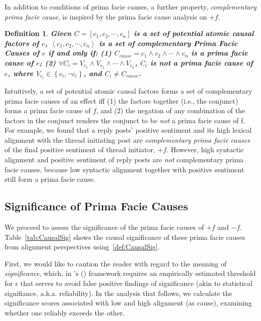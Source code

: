 \documentclass[man,biblatex,floatsintext]{apa6}
\newtheorem{defn}[thm]{Definition}
\newcommand{\citegen}[1]{\citeauthor{#1}'s (\citeyear{#1})}
\begin{document}
In addition to conditions of prima facie causes, a further property, \emph{complementary prima facie cause}, is inspired by the prima facie cause analysis on $+f$.
\begin{defn}
\textbf{Given $C=[c_{1}, c_{2}, \cdots, c_{n}]$ is a set of potential atomic causal factors of $e$, $\left \langle c_{1}, c_{2}, \cdots , c_{n} \right \rangle$ is a set of complementary Prima Facie Causes of $e$ if and only if: (1) $C_{cause}=c_{1} \wedge c_{2} \wedge \cdots \wedge c_{n}$ is a prima facie cause of $e$; (2) $\forall C_{i}= V_{c_{1}} \wedge V_{c_{2}} \wedge \cdots \wedge V_{c_{n}}$, $C_{i}$ is not a prima facie cause of $e$, where $V_{c_{i}} \in \left \{ c_{i}, \neg c_{i}\right \}$, and $C_{i} \neq C_{cause}$.}
\end{defn}
Intuitively, a set of potential atomic causal factors forms a set of complementary
prima facie causes of an effect iff (1) the factors together (i.e., the conjunct) forms a prima facie cause of $f$, and (2) the negation of any combination of the factors in the conjunct renders the conjunct to be {\em not} a prima facie cause of f. For example, we found that a reply posts' positive sentiment and its high lexical alignment with the thread initiating post are \emph{complementary prima facie causes} of the final positive sentiment of thread initiator, $+f$.
However, high syntactic alignment and positive sentiment of reply posts are {\em not} complementary prima facie causes, because low syntactic alignment together with positive sentiment still form a prima facie cause.



\subsection{Significance of Prima Facie Causes}

We proceed to assess the significance of the prima facie causes of $+f$ and $-f$. Table~\ref{tab:CausalSig} shows the causal significance of these prima facie causes from alignment perspectives using~\ref{def:CausalSig}.

First, we would like to caution the reader with regard to the meaning of \emph{significance}, which, in \citegen{kleinberg_uai09} framework requires an empirically estimated threshold for $\epsilon$ that serves to avoid false positive findings of significance (akin to statistical signifiance, a.k.a. reliability).  In the analysis that follows, we calculate the significance scores associated with low and high alignment (as cause), examining whether one reliably exceeds the other.
\end{document}
